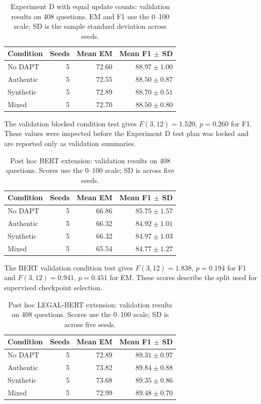 \documentclass[pdflatex,sn-basic]{sn-jnl}
\begin{document}
\begin{table}[!htbp]
\caption{Experiment D with equal update counts: validation results on 408 questions. EM
and F1 use the 0--100 scale; SD is the sample standard deviation across seeds.}
\label{tab:equal_update_validation}
\centering\small
\begin{tabular}{@{}lrrr@{}}
\toprule
Condition & Seeds & Mean EM & Mean F1 $\pm$ SD \\
\midrule
No DAPT & 5 & 72.60 & $88.97\pm1.00$ \\
Authentic & 5 & 72.55 & $88.50\pm0.87$ \\
Synthetic & 5 & 72.89 & $88.70\pm0.51$ \\
Mixed & 5 & 72.70 & $88.50\pm0.80$ \\
\bottomrule
\end{tabular}
\end{table}

The validation blocked condition test gives \(F(3,12)=1.520\),
\(p=0.260\) for F1. These values were inspected before the Experiment D test
plan was locked and are reported only as validation summaries.

\begin{table}[!htbp]
\caption{Post hoc BERT extension: validation results on 408 questions.
Scores use the 0--100 scale; SD is across five seeds.}
\label{tab:bert_extension_validation}
\centering\small
\begin{tabular}{@{}lrrr@{}}
\toprule
Condition & Seeds & Mean EM & Mean F1 $\pm$ SD \\
\midrule
No DAPT & 5 & 66.86 & $85.75\pm1.57$ \\
Authentic & 5 & 66.32 & $84.92\pm1.01$ \\
Synthetic & 5 & 66.32 & $84.97\pm1.03$ \\
Mixed & 5 & 65.54 & $84.77\pm1.27$ \\
\bottomrule
\end{tabular}
\end{table}

The BERT validation condition test gives \(F(3,12)=1.838\), \(p=0.194\)
for F1 and \(F(3,12)=0.941\), \(p=0.451\) for EM. These scores describe
the split used for supervised checkpoint selection.

\begin{table}[!htbp]
\caption{Post hoc LEGAL-BERT extension: validation results on 408 questions.
Scores use the 0--100 scale; SD is across five seeds.}
\label{tab:legalbert_extension_validation}
\centering\small
\begin{tabular}{@{}lrrr@{}}
\toprule
Condition & Seeds & Mean EM & Mean F1 $\pm$ SD \\
\midrule
No DAPT & 5 & 72.89 & $89.31\pm0.97$ \\
Authentic & 5 & 73.82 & $89.84\pm0.88$ \\
Synthetic & 5 & 73.68 & $89.35\pm0.86$ \\
Mixed & 5 & 72.99 & $89.48\pm0.70$ \\
\bottomrule
\end{tabular}
\end{table}
\end{document}
